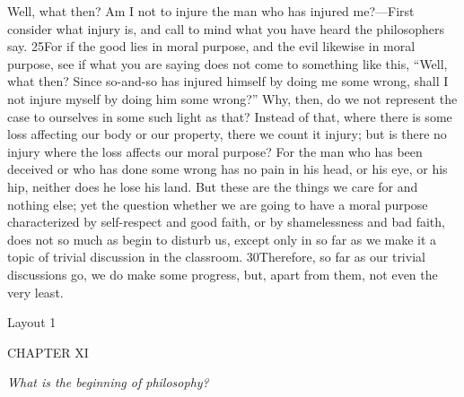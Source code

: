 Well, what then? Am I not to injure the man who has injured me?—First consider what injury is, and call to mind what you have heard the philosophers say. 25For if the good lies in moral purpose, and the evil likewise in moral purpose, see if what you are saying does not come to something like this, ``Well, what then? Since so-and-so has injured himself by doing me some wrong, shall I not injure myself by doing him some wrong?'' Why, then, do we not represent the case to ourselves in some such light as that? Instead of that, where there is some loss affecting our body or our property, there we count it injury; but is there no injury where the loss affects our moral purpose? For the man who has been deceived or who has done some wrong has no pain in his head, or his eye, or his hip, neither does he lose his land. But these are the things we care for and nothing else; yet the question whether we are going to have a moral purpose characterized by self-respect and good faith, or by shamelessness and bad faith, does not so much as begin to disturb us, except only in so far as we make it a topic of trivial discussion in the classroom. 30Therefore, so far as our trivial discussions go, we do make some progress, but, apart from them, not even the very least.



Layout 1

CHAPTER XI

\emph{What is the beginning of philosophy?}

